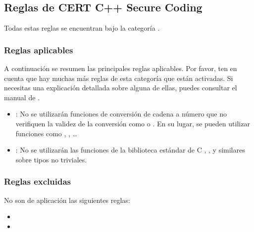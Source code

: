 \subsection{Reglas de CERT C++ Secure Coding}

Todas estas reglas se encuentran bajo la categoría .

\subsubsection{Reglas aplicables}

A continuación se resumen las principales reglas aplicables.
Por favor, ten en cuenta que hay muchas más reglas de esta categoría que están 
activadas. Si necesitas una explicación detallada sobre alguna de ellas,
puedes consultar el manual de .

\begin{itemize}

\item {}:
No se utilizarán funciones de conversión de cadena a número que no
verifiquen la validez de la conversión como  o .
En su lugar, se pueden utilizar funciones como ,
, \ldots

\item {}:
No se utilizarán las funciones de la biblioteca estándar de C
, ,  y similares
sobre tipos no triviales.

\end{itemize}

\subsubsection{Reglas excluidas}

No son de aplicación las siguientes reglas:

\begin{itemize}

\item {}
\item {}

\end{itemize}

